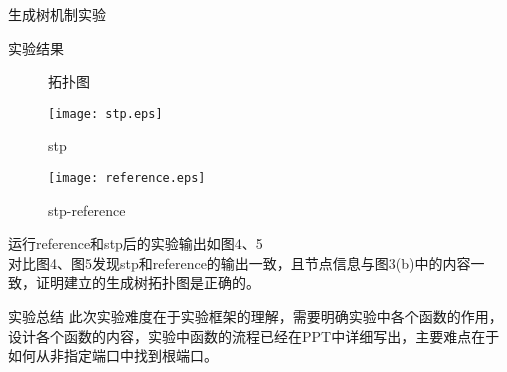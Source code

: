 \documentclass{article} %
\begin{document}
\begin{section}{生成树机制实验}
\begin{subsection}{实验结果}
\begin{enumerate}[1)]
\begin{figure*}
					\centering
					\caption{拓扑图}
				\end{figure*}
				\begin{figure}[!h]	
					\centering
					\texttt{[image: stp.eps]}	
					\caption{stp}
				\end{figure}	
				\begin{figure}[!h]	
					\centering
					\texttt{[image: reference.eps]}	
					\caption{stp-reference}
				\end{figure}
			运行reference和stp后的实验输出如图4、5\\
			对比图4、图5发现stp和reference的输出一致，且节点信息与图3(b)中的内容一致，证明建立的生成树拓扑图是正确的。
			\end{enumerate}
			\end{subsection}
		\begin{subsection}{实验总结}
			此次实验难度在于实验框架的理解，需要明确实验中各个函数的作用，设计各个函数的内容，实验中函数的流程已经在PPT中详细写出，主要难点在于如何从非指定端口中找到根端口。
		\end{subsection}
	\end{section}
\end{document}
